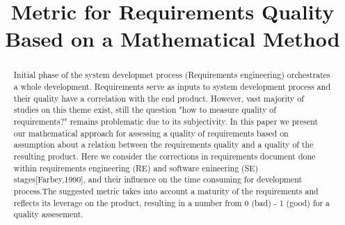 \documentclass[conference]{IEEEtran}
\begin{document}
\title{Metric for Requirements Quality Based on a Mathematical Method} 

\author{
}

\maketitle

\begin{abstract}
Initial phase of the system developmet process (Requirements engineering) orchestrates a whole development. Requirements serve as inputs to system development process and their quality have a correlation with the end product. However, vast majority of studies on this theme exist, still the question "how to measure quality of requirements?" remains problematic due to its subjectivity.
In this paper we present our mathematical approach for assessing a quality of requirements based on assumption about a relation between the requirements quality and a quality of the resulting product. Here we consider the corrections in requirements document done within requirements engineering (RE) and software enineering (SE) stages[Farbey,1990], and their influence on the time consuming for development process.The suggested metric takes into account a maturity of the requirements and reflects its leverage on the product, resulting in a number from 0 (bad) - 1 (good) for a quality assesement. 
\end{abstract}


\IEEEpeerreviewmaketitle










\end{document}
